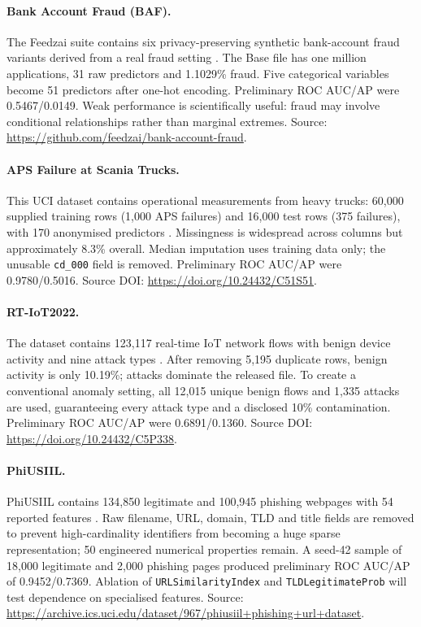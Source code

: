 \documentclass[11pt,a4paper,twocolumn]{article}
\begin{document}
\paragraph{Bank Account Fraud (BAF).}
The Feedzai suite contains six privacy-preserving synthetic bank-account fraud variants derived from a real fraud setting \citep{jesus2022}. The Base file has one million applications, 31 raw predictors and 1.1029\% fraud. Five categorical variables become 51 predictors after one-hot encoding. Preliminary ROC AUC/AP were 0.5467/0.0149. Weak performance is scientifically useful: fraud may involve conditional relationships rather than marginal extremes. Source: \url{https://github.com/feedzai/bank-account-fraud}.

\paragraph{APS Failure at Scania Trucks.}
This UCI dataset contains operational measurements from heavy trucks: 60,000 supplied training rows (1,000 APS failures) and 16,000 test rows (375 failures), with 170 anonymised predictors \citep{scania2016}. Missingness is widespread across columns but approximately 8.3\% overall. Median imputation uses training data only; the unusable \texttt{cd\_000} field is removed. Preliminary ROC AUC/AP were 0.9780/0.5016. Source DOI: \url{https://doi.org/10.24432/C51S51}.

\paragraph{RT-IoT2022.}
The dataset contains 123,117 real-time IoT network flows with benign device activity and nine attack types \citep{sarmila2023}. After removing 5,195 duplicate rows, benign activity is only 10.19\%; attacks dominate the released file. To create a conventional anomaly setting, all 12,015 unique benign flows and 1,335 attacks are used, guaranteeing every attack type and a disclosed 10\% contamination. Preliminary ROC AUC/AP were 0.6891/0.1360. Source DOI: \url{https://doi.org/10.24432/C5P338}.

\paragraph{PhiUSIIL.}
PhiUSIIL contains 134,850 legitimate and 100,945 phishing webpages with 54 reported features \citep{prasad2024}. Raw filename, URL, domain, TLD and title fields are removed to prevent high-cardinality identifiers from becoming a huge sparse representation; 50 engineered numerical properties remain. A seed-42 sample of 18,000 legitimate and 2,000 phishing pages produced preliminary ROC AUC/AP of 0.9452/0.7369. Ablation of \texttt{URLSimilarityIndex} and \texttt{TLDLegitimateProb} will test dependence on specialised features. Source: \url{https://archive.ics.uci.edu/dataset/967/phiusiil+phishing+url+dataset}.
\end{document}
